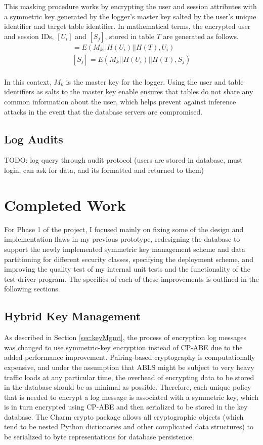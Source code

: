 \documentclass{sig-alternate}
\begin{document}
This masking procedure works by encrypting the user and session attributes with a symmetric key generated
by the logger's master key salted by the user's unique identifier and target table identifier. In mathematical
terms, the encrypted user and session IDs, $[U_i]$ and $[S_j]$, stored in table $T$ are generated as follows.
\begin{align*}
[U_i] = E(M_k || H(U_i) || H(T), U_i) \\
[S_j] = E(M_k || H(U_i) || H(T), S_j) \\
\end{align*}

In this context, $M_k$ is the master key for the logger. Using the user and table identifiers as salts to the master key 
enable ensures that tables do not share any common information about the user, which helps prevent against 
inference attacks in the event that the database servers are compromised.

\subsection{Log Audits}
\label{sec:audit}
TODO: log query through audit protocol (users are stored in database, must login, can ask for data, and its formatted and returned to them)

\section{Completed Work}
For Phase 1 of the project, I focused mainly on fixing some of the design and implementation flaws in my previous 
prototype, redesigning the database to support the newly implemented symmetric key management scheme and data 
partitioning for different security classes, specifying the deployment scheme, and improving the quality test
of my internal unit tests and the functionality of the test driver program. The specifics of each of these improvements is
outlined in the following sections.

\subsection{Hybrid Key Management}
As described in Section \ref{sec:keyMgmt}, the process of encryption log messages was changed to use symmetric-key
encryption instead of CP-ABE due to the added performance improvement. Pairing-based cryptography is computationally
expensive, and under the assumption that ABLS might be subject to very heavy traffic loads at any particular time, the 
overhead of encrypting data to be stored in the database should be as minimal as possible. Therefore, each unique
policy that is needed to encrypt a log message is associated with a symmetric key, which is in turn encrypted using 
CP-ABE and then serialized to be stored in the key database. The Charm crypto package allows all cryptographic 
objects (which tend to be nested Python dictionaries and other complicated data structures) to be serialized to byte 
representations for database persistence. 
\end{document}

